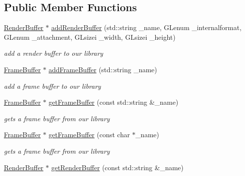 \subsection*{Public Member Functions}
\begin{DoxyCompactItemize}
\item 
\hyperlink{class_render_buffer}{Render\-Buffer} $\ast$ \hyperlink{class_render_target_lib_a0ff27ec9ae3c085a2bce4e05c180e0e3}{add\-Render\-Buffer} (std\-::string \-\_\-name, G\-Lenum \-\_\-internalformat, G\-Lenum \-\_\-attachment, G\-Lsizei \-\_\-width, G\-Lsizei \-\_\-height)
\begin{DoxyCompactList}\small\item\em add a render buffer to our library \end{DoxyCompactList}\item 
\hypertarget{class_render_target_lib_ac5971bca0f97cedf1e7c16d8d1233fdc}{\hyperlink{class_frame_buffer}{Frame\-Buffer} $\ast$ \hyperlink{class_render_target_lib_ac5971bca0f97cedf1e7c16d8d1233fdc}{add\-Frame\-Buffer} (std\-::string \-\_\-name)}\label{class_render_target_lib_ac5971bca0f97cedf1e7c16d8d1233fdc}

\begin{DoxyCompactList}\small\item\em add a frame buffer to our library \end{DoxyCompactList}\item 
\hypertarget{class_render_target_lib_a30afc5063831926612da80726dea0f04}{\hyperlink{class_frame_buffer}{Frame\-Buffer} $\ast$ \hyperlink{class_render_target_lib_a30afc5063831926612da80726dea0f04}{get\-Frame\-Buffer} (const std\-::string \&\-\_\-name)}\label{class_render_target_lib_a30afc5063831926612da80726dea0f04}

\begin{DoxyCompactList}\small\item\em gets a frame buffer from our library \end{DoxyCompactList}\item 
\hypertarget{class_render_target_lib_a9695e1a845c84e76c10bec26460b0e8b}{\hyperlink{class_frame_buffer}{Frame\-Buffer} $\ast$ \hyperlink{class_render_target_lib_a9695e1a845c84e76c10bec26460b0e8b}{get\-Frame\-Buffer} (const char $\ast$\-\_\-name)}\label{class_render_target_lib_a9695e1a845c84e76c10bec26460b0e8b}

\begin{DoxyCompactList}\small\item\em gets a frame buffer from our library \end{DoxyCompactList}\item 
\hypertarget{class_render_target_lib_acf1fa30e68dc74deca512b0c77786d0a}{\hyperlink{class_render_buffer}{Render\-Buffer} $\ast$ \hyperlink{class_render_target_lib_acf1fa30e68dc74deca512b0c77786d0a}{get\-Render\-Buffer} (const std\-::string \&\-\_\-name)}\label{class_render_target_lib_acf1fa30e68dc74deca512b0c77786d0a}


\end{DoxyCompactItemize}
